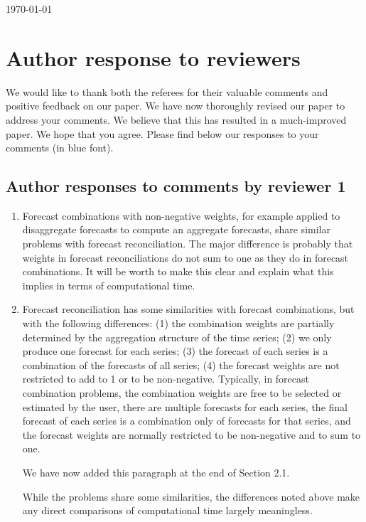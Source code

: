 \documentclass[10pt,a4paper]{article}
\begin{document}
\today
\section*{Author response to reviewers}
We would like to thank both the referees for their valuable comments and positive feedback on our paper. We have now thoroughly revised our paper to address your comments. We believe that this has resulted in a much-improved paper. We hope that you agree. Please find below our responses to your comments (in {\color{blue} blue} font).

\subsection*{Author responses to comments by reviewer 1}
\begin{enumerate}
	\item Forecast combinations with non-negative weights, for example applied to disaggregate forecasts to compute an aggregate forecasts, share similar problems with forecast reconciliation. The major difference is probably that weights in forecast reconciliations do not sum to one as they do in forecast combinations. It will be worth to make this clear and {\color{red} explain what this implies in terms of computational time.}
	\item [] {\color{blue} Forecast reconciliation has some similarities with forecast combinations, but with the following differences: (1) the combination weights are partially determined by the aggregation structure of the time series; (2) we only produce one forecast for each series; (3) the forecast of each series is a combination of the forecasts of all series; (4) the forecast weights are not restricted to add to 1 or to be non-negative. Typically, in forecast combination problems, the combination weights are free to be selected or estimated by the user, there are multiple forecasts for each series, the final forecast of each series is a combination only of forecasts for that series, and the forecast weights are normally restricted to be non-negative and to sum to one.

  We have now added this paragraph at the end of Section 2.1.

  While the problems share some similarities, the differences noted above make any direct comparisons of computational time largely meaningless.



}
\end{enumerate}
\end{document}
